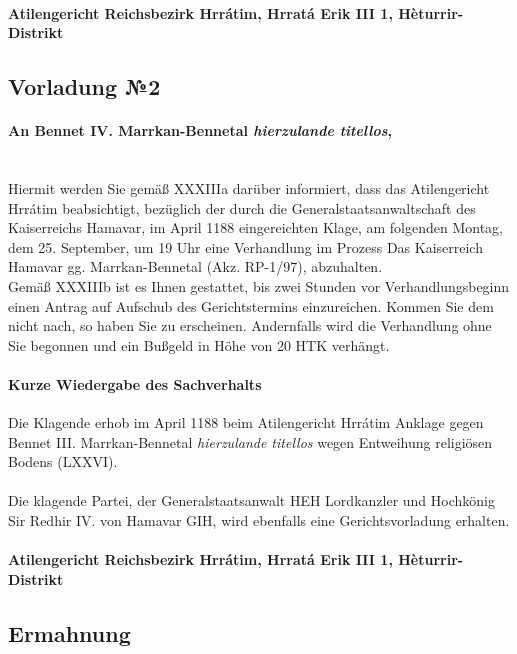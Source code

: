 \documentclass{article}
\begin{document}
\paragraph{Atilengericht Reichsbezirk Hrrátim, Hrratá Erik III 1, Hèturrir-Distrikt}
\newpage
\subsection{Vorladung №2}
\paragraph{An Bennet IV. Marrkan-Bennetal \textit{hierzulande titellos},\\\\}
Hiermit werden Sie gemäß XXXIIIa darüber informiert, dass das Atilengericht Hrrátim beabsichtigt, bezüglich der durch die Generalstaatsanwaltschaft des Kaiserreichs Hamavar, 
im April 1188 eingereichten Klage, am folgenden Montag, dem 25. September, um 19 Uhr eine Verhandlung im Prozess Das Kaiserreich Hamavar gg. Marrkan-Bennetal (Akz. RP-1/97), abzuhalten.\\
Gemäß XXXIIIb ist es Ihnen gestattet, bis zwei Stunden vor Verhandlungsbeginn einen Antrag auf Aufschub des Gerichtstermins einzureichen.
Kommen Sie dem nicht nach, so haben Sie zu erscheinen. Andernfalls wird die Verhandlung ohne Sie begonnen und ein Bußgeld in Höhe von 20
HTK verhängt.
\paragraph{Kurze Wiedergabe des Sachverhalts\\}
Die Klagende erhob im April 1188 beim Atilengericht Hrrátim Anklage gegen Bennet III. Marrkan-Bennetal \textit{hierzulande titellos} wegen Entweihung religiösen Bodens
(LXXVI).\\\\
Die klagende Partei, der Generalstaatsanwalt HEH Lordkanzler und Hochkönig Sir Redhir IV. von Hamavar GIH, wird ebenfalls eine Gerichtsvorladung erhalten.\\

\paragraph{Atilengericht Reichsbezirk Hrrátim, Hrratá Erik III 1, Hèturrir-Distrikt}
\subsection{Ermahnung}
\end{document}

